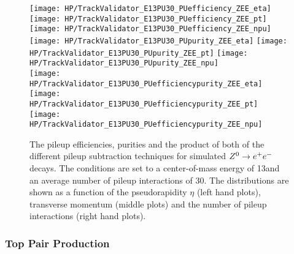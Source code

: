 \begin{figure}[!t]
  \centering
  \texttt{[image: HP/TrackValidator\_E13PU30\_PUefficiency\_ZEE\_eta]}
  \texttt{[image: HP/TrackValidator\_E13PU30\_PUefficiency\_ZEE\_pt]}
  \texttt{[image: HP/TrackValidator\_E13PU30\_PUefficiency\_ZEE\_npu]}
   \\
  \texttt{[image: HP/TrackValidator\_E13PU30\_PUpurity\_ZEE\_eta]}
  \texttt{[image: HP/TrackValidator\_E13PU30\_PUpurity\_ZEE\_pt]}
  \texttt{[image: HP/TrackValidator\_E13PU30\_PUpurity\_ZEE\_npu]}
   \\
  \texttt{[image: HP/TrackValidator\_E13PU30\_PUefficiencypurity\_ZEE\_eta]}
  \texttt{[image: HP/TrackValidator\_E13PU30\_PUefficiencypurity\_ZEE\_pt]}
  \texttt{[image: HP/TrackValidator\_E13PU30\_PUefficiencypurity\_ZEE\_npu]}
  \caption[Pileup efficiencies, purities and their product of the different pileup subtraction techniques for $\Zz\rightarrow\EE$ decays with 13\TeV and PU=30]{The pileup efficiencies, purities and the product of both of the different pileup subtraction techniques for simulated $\Zz\rightarrow\EE$ decays. The conditions are set to a center-of-mass energy of 13\TeV and an average number of pileup interactions of 30. The distributions are shown as a function of the pseudorapidity $\eta$ (left hand plots), transverse momentum (middle plots) and the number of pileup interactions (right hand plots). \label{plot:HPUTAE13PU30ZtoeePUComp}}
\end{figure}

\subsubsection{Top Pair Production \label{sec:HPUTAE13PU30TT}}

